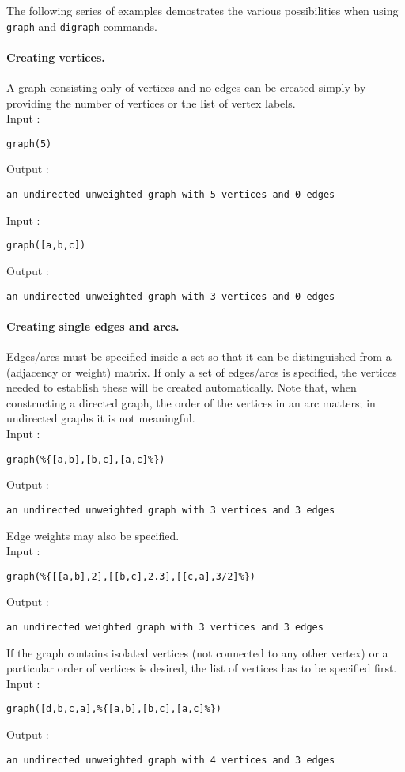 \documentclass[a4paper,11pt]{article}
\begin{document}
The following series of examples demostrates the various possibilities when using {\tt graph} and {\tt digraph} commands.

\paragraph{Creating vertices.}
A graph consisting only of vertices and no edges can be created simply by providing the number of vertices or the list of vertex labels.\\
Input :
\begin{center}
  \tt graph(5)
\end{center}
Output :
\begin{center}
  \tt an undirected unweighted graph with 5 vertices and 0 edges
\end{center}
Input :
\begin{center}
  \tt graph([a,b,c])
\end{center}
Output :
\begin{center}
  \tt an undirected unweighted graph with 3 vertices and 0 edges
\end{center}

\paragraph{Creating single edges and arcs.}
Edges/arcs must be specified inside a set so that it can be distinguished from a (adjacency or weight) matrix. If only a set of edges/arcs is specified, the vertices needed to establish these will be created automatically. Note that, when constructing a directed graph, the order of the vertices in an arc matters; in undirected graphs it is not meaningful.\\
Input :
\begin{center}
  \tt graph(\%\{[a,b],[b,c],[a,c]\%\})
\end{center}
Output :
\begin{center}
  \tt an undirected unweighted graph with 3 vertices and 3 edges
\end{center}
Edge weights may also be specified.\\
Input :
\begin{center}
  \tt graph(\%\{[[a,b],2],[[b,c],2.3],[[c,a],3/2]\%\})
\end{center}
Output :
\begin{center}
  \tt an undirected weighted graph with 3 vertices and 3 edges
\end{center}
If the graph contains isolated vertices (not connected to any other vertex) or a particular order of vertices is desired, the list of vertices has to be specified first.\\
Input :
\begin{center}
  \tt graph([d,b,c,a],\%\{[a,b],[b,c],[a,c]\%\})
\end{center}
Output :
\begin{center}
  \tt an undirected unweighted graph with 4 vertices and 3 edges
\end{center}
\end{document}
